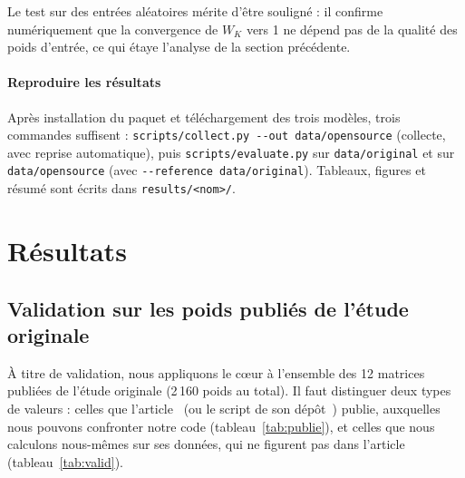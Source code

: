 \documentclass[11pt,a4paper]{article}
\newcommand{\code}[1]{\texttt{#1}}
\begin{document}
Le test sur des entrées aléatoires mérite d'être souligné : il confirme numériquement que la convergence de $W_K$ vers 1 ne dépend pas de la qualité des poids d'entrée, ce qui étaye l'analyse de la section précédente.

\paragraph{Reproduire les résultats} Après installation du paquet et téléchargement des trois modèles, trois commandes suffisent : \code{scripts/collect.py -{}-out data/opensource} (collecte, avec reprise automatique), puis \code{scripts/evaluate.py} sur \code{data/original} et sur \code{data/opensource} (avec \code{-{}-reference data/original}). Tableaux, figures et résumé sont écrits dans \code{results/<nom>/}.

\section{Résultats}\label{sec:resultats}

\subsection{Validation sur les poids publiés de l'étude originale}\label{sec:valid}

À titre de validation, nous appliquons le cœur à l'ensemble des 12 matrices publiées de l'étude originale (2\,160 poids au total). Il faut distinguer deux types de valeurs : celles que l'article~\cite{vahidnia} (ou le script de son dépôt~\cite{masllms}) publie, auxquelles nous pouvons confronter notre code (tableau~\ref{tab:publie}), et celles que nous calculons nous-mêmes sur ses données, qui ne figurent pas dans l'article (tableau~\ref{tab:valid}).
\end{document}
